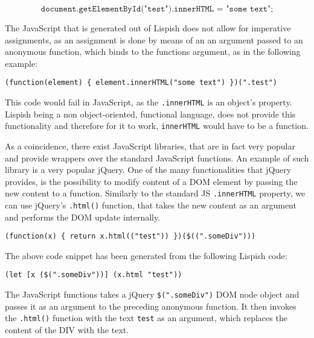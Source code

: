 $$ \texttt{document.getElementById("test").innerHTML = "some text";} $$


The JavaScript that is generated out of Lispish does not allow for imperative assignments, as an assignment is done by means of an an argument passed to an anonymous function, which binds to the functions argument, as in the following 
example:  

\begin{verbatim}
(function(element) { element.innerHTML("some text") })(".test")
\end{verbatim}


This code would fail in JavaScript, as the \texttt{.innerHTML} is an object's property. Lispish being a non object-oriented, functional language, does not provide this functionality and therefore for it to work, \texttt{innerHTML} would have to be a function.

As a coincidence, there exist JavaScript libraries, that are in fact very popular and provide wrappers over the standard JavaScript functions.
An example of such library is a very popular jQuery\cite{jquery}. 
One of the many functionalities that jQuery provides, is the possibility to modify content of a DOM element by passing the new content to a function.
Similarly to the standard JS \texttt{.innerHTML} property, we can use jQuery's \texttt{.html()} function, that takes the new content as an argument and performs the DOM update internally. 

\begin{verbatim}
(function(x) { return x.html(("test")) })($((".someDiv")))
\end{verbatim}

The above code snippet has been generated from the following Lispish code:

\begin{verbatim}
(let [x ($(".someDiv"))] (x.html "test"))
\end{verbatim}

The JavaScript functions takes a jQuery \texttt{\$(".someDiv")} DOM node object and passes it as an argument to the preceding anonymous function.
It then invokes the \texttt{.html()} function with the text \texttt{test} as an argument, which replaces the content of the DIV with the text.









